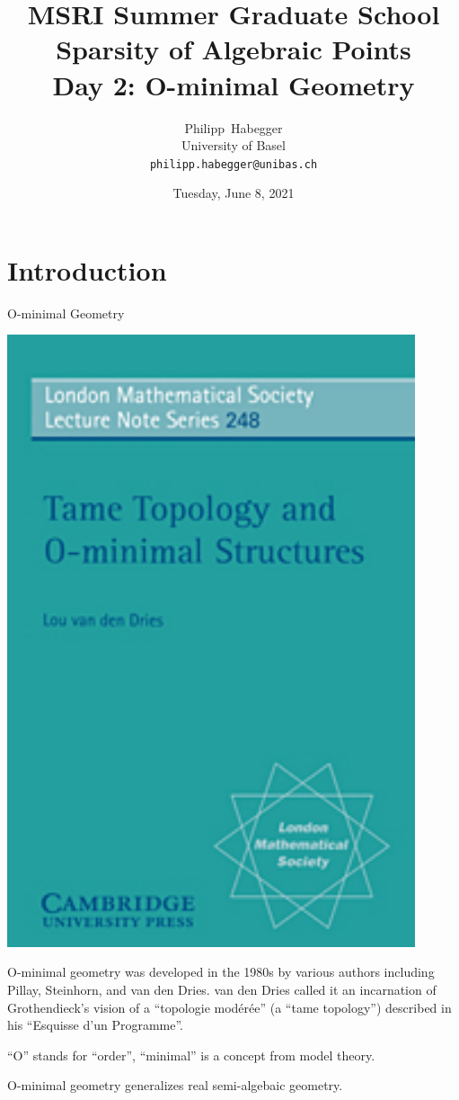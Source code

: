 \documentclass{beamer}
\title{MSRI Summer Graduate School \\ Sparsity of Algebraic Points \\
  Day 2: O-minimal Geometry}
\author{Philipp~Habegger \\ University of Basel \\ \texttt{philipp.habegger@unibas.ch}}
\date{Tuesday, June 8, 2021}
\begin{document}
\setlength{\abovecaptionskip}{0pt} 
\setlength{\belowcaptionskip}{0pt} 

\renewcommand{\figurename}{Fig.}


\begin{frame}
  \titlepage
\end{frame}

\section{Introduction}
\begin{frame}{O-minimal Geometry}
  \begin{minipage}{0.3\linewidth}
    \includegraphics[width=0.9\textwidth]{vddries_title.jpg}    
  \end{minipage}\begin{minipage}{0.6\linewidth}
    O-minimal geometry was developed in the 1980s by various authors
    including Pillay, Steinhorn, and van den Dries. van den Dries called it an
    incarnation of Grothendieck's vision of a ``topologie
    mod\'er\'ee'' (a ``tame topology'') described
    in his ``Esquisse d'un Programme''.  
  \end{minipage}

  ``O'' stands for ``order'',  ``minimal'' is a concept from model
  theory.

  O-minimal geometry generalizes real semi-algebaic geometry. 
\end{frame}
\end{document}
